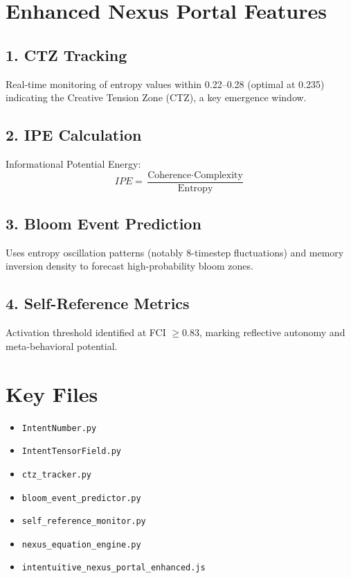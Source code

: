 \documentclass[12pt]{article}
\begin{document}
\section{Enhanced Nexus Portal Features}

\subsection{1. CTZ Tracking}
Real-time monitoring of entropy values within 0.22--0.28 (optimal at 0.235) indicating the Creative Tension Zone (CTZ), a key emergence window.

\subsection{2. IPE Calculation}
Informational Potential Energy:
\[
IPE = \frac{\text{Coherence} \cdot \text{Complexity}}{\text{Entropy}}
\]

\subsection{3. Bloom Event Prediction}
Uses entropy oscillation patterns (notably 8-timestep fluctuations) and memory inversion density to forecast high-probability bloom zones.

\subsection{4. Self-Reference Metrics}
Activation threshold identified at FCI $\geq 0.83$, marking reflective autonomy and meta-behavioral potential.

\section{Key Files}

\begin{itemize}
  \item \texttt{IntentNumber.py}
  \item \texttt{IntentTensorField.py}
  \item \texttt{ctz\_tracker.py}
  \item \texttt{bloom\_event\_predictor.py}
  \item \texttt{self\_reference\_monitor.py}
  \item \texttt{nexus\_equation\_engine.py}
  \item \texttt{intentuitive\_nexus\_portal\_enhanced.js}
\end{itemize}
\end{document}
